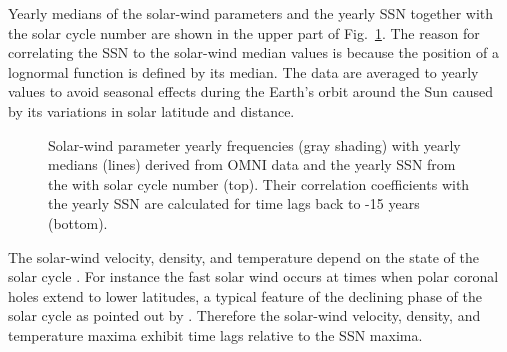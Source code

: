 \documentclass[]{aa}
\begin{document}
        Yearly medians of the solar-wind parameters and the yearly SSN together with the solar cycle number are shown in the upper part of Fig.~\ref{fig:OMNI_yearly_ssn_correlation_c_plot}. The reason for correlating the SSN to the solar-wind median values is because the position of a lognormal function is defined by its median. The data are averaged to yearly values to avoid seasonal effects during the Earth’s orbit around the Sun caused by its variations in solar latitude and distance.
        \begin{figure}
                \caption{Solar-wind parameter yearly frequencies (gray shading) with yearly medians (lines) derived from OMNI data and the yearly SSN from the \citet{sidc} with solar cycle number (top). Their correlation coefficients with the yearly SSN are calculated for time lags back to -15 years (bottom).}
                \label{fig:OMNI_yearly_ssn_correlation_c_plot}
        \end{figure}
        The solar-wind velocity, density, and temperature depend on the state of the solar cycle \citep{Schwenn1983}.
        For instance the fast solar wind occurs at times when polar coronal holes extend to lower latitudes, a typical feature of the declining phase of the solar cycle as pointed out by \citet[p.~75, Fig.~3.52]{Bothmer2007}. Therefore the solar-wind velocity, density, and temperature maxima exhibit time lags relative to the SSN maxima.
\end{document}
